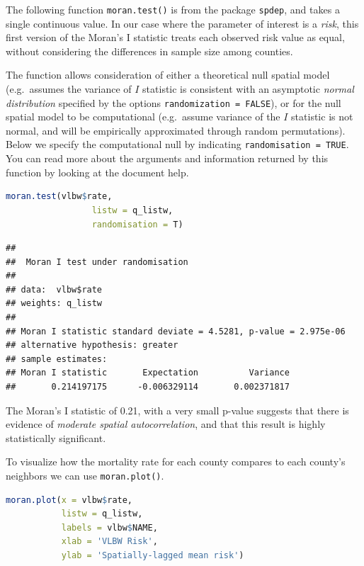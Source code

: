 \documentclass[
]{book}
\newcommand{\passthrough}[1]{#1}
\begin{document}
The following function \passthrough{\lstinline!moran.test()!} is from the package \passthrough{\lstinline!spdep!}, and takes a single continuous value. In our case where the parameter of interest is a \emph{risk}, this first version of the Moran's I statistic treats each observed risk value as equal, without considering the differences in sample size among counties.

The function allows consideration of either a theoretical null spatial model (e.g.~assumes the variance of \(I\) statistic is consistent with an asymptotic \emph{normal distribution} specified by the options \passthrough{\lstinline!randomization = FALSE!}), or for the null spatial model to be computational (e.g.~assume variance of the \(I\) statistic is not normal, and will be empirically approximated through random permutations). Below we specify the computational null by indicating \passthrough{\lstinline!randomisation = TRUE!}. You can read more about the arguments and information returned by this function by looking at the document help.

\begin{lstlisting}[language=R]
moran.test(vlbw$rate, 
                 listw = q_listw, 
                 randomisation = T)
\end{lstlisting}

\begin{lstlisting}
## 
## 	Moran I test under randomisation
## 
## data:  vlbw$rate  
## weights: q_listw    
## 
## Moran I statistic standard deviate = 4.5281, p-value = 2.975e-06
## alternative hypothesis: greater
## sample estimates:
## Moran I statistic       Expectation          Variance 
##       0.214197175      -0.006329114       0.002371817
\end{lstlisting}

The Moran's I statistic of 0.21, with a very small p-value suggests that there is evidence of \emph{moderate spatial autocorrelation}, and that this result is highly statistically significant.

To visualize how the mortality rate for each county compares to each county's neighbors we can use \passthrough{\lstinline!moran.plot()!}.

\begin{lstlisting}[language=R]
moran.plot(x = vlbw$rate, 
           listw = q_listw, 
           labels = vlbw$NAME, 
           xlab = 'VLBW Risk', 
           ylab = 'Spatially-lagged mean risk')
\end{lstlisting}
\end{document}

